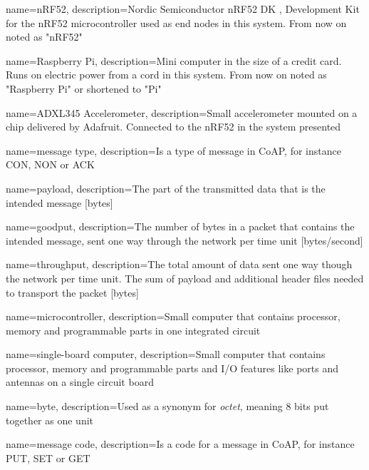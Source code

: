 \pagestyle{empty}


{
	name=nRF52,
    description={Nordic Semiconductor nRF52 DK , Development Kit for the nRF52 microcontroller used as end nodes in this system. From now on noted as "nRF52"}
}

{
	name=Raspberry Pi,
    description={Mini computer in the size of a credit card. Runs on electric power from a cord in this system. From now on noted as "Raspberry Pi" or shortened to "Pi"}
}

{
	name=ADXL345 Accelerometer,
    description={Small accelerometer mounted on a chip delivered by Adafruit. Connected to the nRF52 in the system presented}
}


{
    name=message type,
    description={Is a type of message in CoAP, for instance CON, NON or ACK}
}

{
    name=payload,
    description={The part of the transmitted data that is the intended message [bytes] }
}

{
	name=goodput,
	description={The number of bytes in a packet that contains the intended message, sent one way through the network per time unit [bytes/second]}
}

{
	name=throughput,
	description={The total amount of data sent one way though the network per time unit. The sum of payload and additional header files needed to transport the packet [bytes]}
}

{
    name=microcontroller,
    description={Small computer that contains processor, memory and programmable parts in one integrated circuit}
}

{
    name=single-board computer,
    description={Small computer that contains processor, memory and programmable parts and I/O features like ports and antennas on a single circuit board}
}

{
    name=byte,
    description={Used as a synonym for \textit{octet}, meaning 8 bits put together as one unit}
}

{
    name=message code,
    description={Is a code for a message in CoAP, for instance PUT, SET or GET}
}

